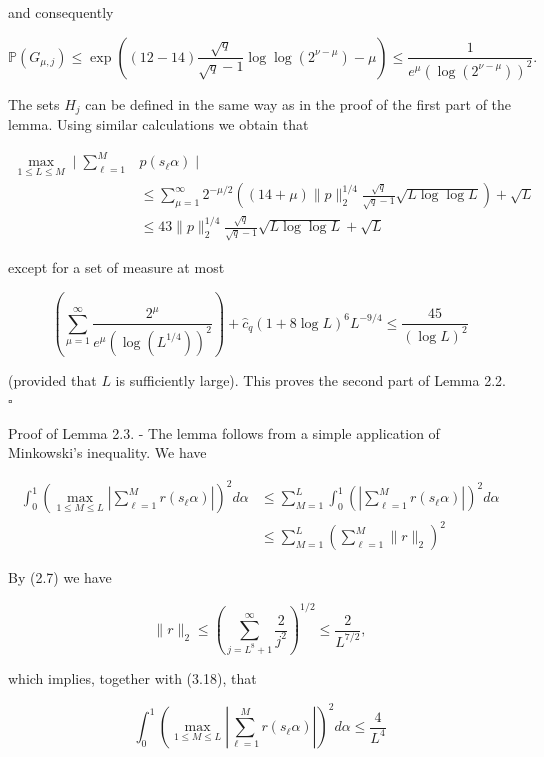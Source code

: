 \documentclass[10pt]{article}
\begin{document}
and consequently

$$
\mathbb{P}\left(G_{\mu, j}\right) \leqslant \exp \left((12-14) \frac{\sqrt{q}}{\sqrt{q}-1} \log \log \left(2^{\nu-\mu}\right)-\mu\right) \leqslant \frac{1}{e^{\mu}\left(\log \left(2^{\nu-\mu}\right)\right)^{2}} .
$$

The sets $H_{j}$ can be defined in the same way as in the proof of the first part of the lemma. Using similar calculations we obtain that

$$
\begin{array}{rl}
\max _{1 \leqslant L \leqslant M} \mid \sum_{\ell=1}^{M} & p\left(s_{\ell} \alpha\right) \mid \\
& \leqslant \sum_{\mu=1}^{\infty} 2^{-\mu / 2}\left((14+\mu)\|p\|_{2}^{1 / 4} \frac{\sqrt{q}}{\sqrt{q}-1} \sqrt{L \log \log L}\right)+\sqrt{L} \\
& \leqslant 43\|p\|_{2}^{1 / 4} \frac{\sqrt{q}}{\sqrt{q}-1} \sqrt{L \log \log L}+\sqrt{L}
\end{array}
$$

except for a set of measure at most

$$
\left(\sum_{\mu=1}^{\infty} \frac{2^{\mu}}{e^{\mu}\left(\log \left(L^{1 / 4}\right)\right)^{2}}\right)+\hat{c}_{q}(1+8 \log L)^{6} L^{-9 / 4} \leqslant \frac{45}{(\log L)^{2}}
$$

(provided that $L$ is sufficiently large). This proves the second part of Lemma 2.2. \(\square\)

Proof of Lemma 2.3. - The lemma follows from a simple application of Minkowski's inequality. We have


\begin{align*}
\int_{0}^{1}\left(\max _{1 \leqslant M \leqslant L}\left|\sum_{\ell=1}^{M} r\left(s_{\ell} \alpha\right)\right|\right)^{2} d \alpha & \leqslant \sum_{M=1}^{L} \int_{0}^{1}\left(\left|\sum_{\ell=1}^{M} r\left(s_{\ell} \alpha\right)\right|\right)^{2} d \alpha \\
& \leqslant \sum_{M=1}^{L}\left(\sum_{\ell=1}^{M}\|r\|_{2}\right)^{2} \tag{3.18}
\end{align*}


By (2.7) we have

$$
\|r\|_{2} \leqslant\left(\sum_{j=L^{8}+1}^{\infty} \frac{2}{j^{2}}\right)^{1 / 2} \leqslant \frac{2}{L^{7 / 2}},
$$

which implies, together with (3.18), that

$$
\int_{0}^{1}\left(\max _{1 \leqslant M \leqslant L}\left|\sum_{\ell=1}^{M} r\left(s_{\ell} \alpha\right)\right|\right)^{2} d \alpha \leqslant \frac{4}{L^{4}}
$$
\end{document}
